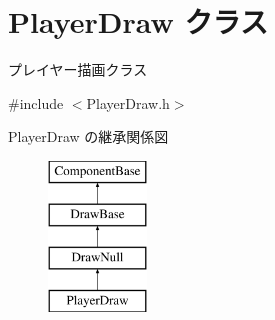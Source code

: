 \hypertarget{class_player_draw}{}\section{Player\+Draw クラス}
\label{class_player_draw}


プレイヤー描画クラス  




{\ttfamily \#include $<$Player\+Draw.\+h$>$}

Player\+Draw の継承関係図\begin{figure}[H]
\begin{center}
\leavevmode
\includegraphics[height=4.000000cm]{class_player_draw}
\end{center}
\end{figure}
